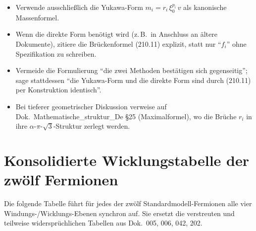 \begin{itemize}
  \item Verwende ausschließlich die Yukawa-Form
        $m_i = r_i\,\xi_0^{p_i}\,v$ als kanonische Massenformel.
  \item Wenn die direkte Form benötigt wird (z.\,B.\ in Anschluss an
        ältere Dokumente), zitiere die Brückenformel (210.11)
        explizit, statt nur \enquote{$f_i$} ohne Spezifikation
        zu schreiben.
  \item Vermeide die Formulierung \enquote{die zwei Methoden
        bestätigen sich gegenseitig}; sage stattdessen
        \enquote{die Yukawa-Form und die direkte Form sind durch
        (210.11) per Konstruktion identisch}.
  \item Bei tieferer geometrischer Diskussion verweise auf
        Dok.~Mathematische\_struktur\_De §25 (Maximalformel), wo
        die Brüche $r_i$ in ihre $\alpha$-$\pi$-$\sqrt{3}$-Struktur
        zerlegt werden.
\end{itemize}

\section{\texorpdfstring{Konsolidierte Wicklungstabelle der zwölf Fermionen}{Konsolidierte Wicklungstabelle der zwoelf Fermionen}}

Die folgende Tabelle führt für jedes der zwölf Standardmodell-Fermionen
alle vier Windungs-/Wicklungs-Ebenen synchron auf. Sie ersetzt die
verstreuten und teilweise widersprüchlichen Tabellen aus Dok.~005, 006,
042, 202.

